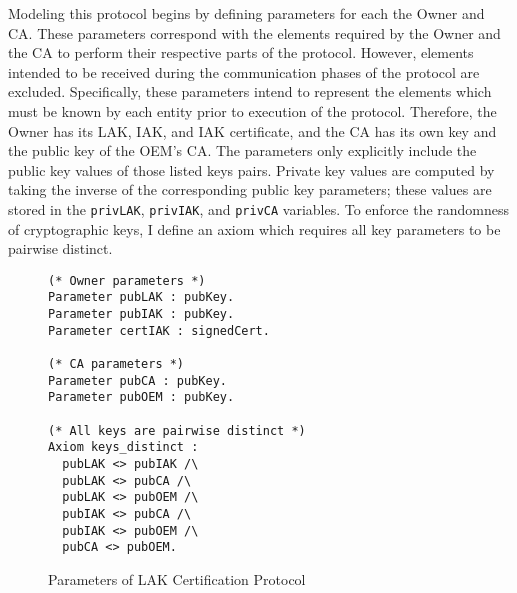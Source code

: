 Modeling this protocol begins by defining parameters for each the Owner and CA. These parameters correspond with the elements required by the Owner and the CA to perform their respective parts of the protocol. However, elements intended to be received during the communication phases of the protocol are excluded. Specifically, these parameters intend to represent the elements which must be known by each entity prior to execution of the protocol. Therefore, the Owner has its LAK, IAK, and IAK certificate, and the CA has its own key and the public key of the OEM's CA. The parameters only explicitly include the public key values of those listed keys pairs. Private key values are computed by taking the inverse of the corresponding public key parameters; these values are stored in the \verb|privLAK|, \verb|privIAK|, and \verb|privCA| variables. To enforce the randomness of cryptographic keys, I define an axiom which requires all key parameters to be pairwise distinct. 
\begin{figure}[h]
\begin{lstlisting}[language=Coq]
(* Owner parameters *)
Parameter pubLAK : pubKey.
Parameter pubIAK : pubKey.
Parameter certIAK : signedCert.

(* CA parameters *)
Parameter pubCA : pubKey.
Parameter pubOEM : pubKey.

(* All keys are pairwise distinct *)
Axiom keys_distinct :
  pubLAK <> pubIAK /\
  pubLAK <> pubCA /\
  pubLAK <> pubOEM /\
  pubIAK <> pubCA /\
  pubIAK <> pubOEM /\
  pubCA <> pubOEM.
\end{lstlisting}
\caption{Parameters of LAK Certification Protocol}
\end{figure}

